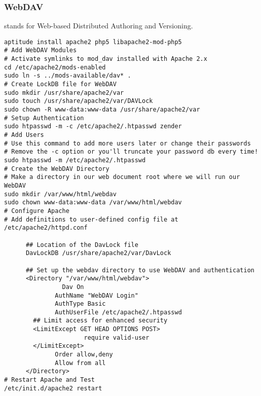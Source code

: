 \documentclass[12pt,twoside]{article}
\begin{document}
\subsubsection{WebDAV}\label{sxn:dav}
 stands for Web-based Distributed Authoring and
Versioning.
\begin{verbatim}
aptitude install apache2 php5 libapache2-mod-php5
# Add WebDAV Modules
# Activate symlinks to mod_dav installed with Apache 2.x
cd /etc/apache2/mods-enabled
sudo ln -s ../mods-available/dav* .
# Create LockDB file for WebDAV
sudo mkdir /usr/share/apache2/var
sudo touch /usr/share/apache2/var/DAVLock
sudo chown -R www-data:www-data /usr/share/apache2/var
# Setup Authentication
sudo htpasswd -m -c /etc/apache2/.htpasswd zender
# Add Users
# Use this command to add more users later or change their passwords
# Remove the -c option or you'll truncate your password db every time! 
sudo htpasswd -m /etc/apache2/.htpasswd 
# Create the WebDAV Directory
# Make a directory in our web document root where we will run our WebDAV
sudo mkdir /var/www/html/webdav
sudo chown www-data:www-data /var/www/html/webdav
# Configure Apache
# Add definitions to user-defined config file at /etc/apache2/httpd.conf

      ## Location of the DavLock file
      DavLockDB /usr/share/apache2/var/DavLock
             
      ## Set up the webdav directory to use WebDAV and authentication
      <Directory "/var/www/html/webdav">
             	Dav On
              AuthName "WebDAV Login"
              AuthType Basic
              AuthUserFile /etc/apache2/.htpasswd
      	## Limit access for enhanced security
      	<LimitExcept GET HEAD OPTIONS POST>
                      require valid-user
      	</LimitExcept>
              Order allow,deny
              Allow from all
      </Directory>
# Restart Apache and Test
/etc/init.d/apache2 restart
\end{verbatim}
\end{document}
